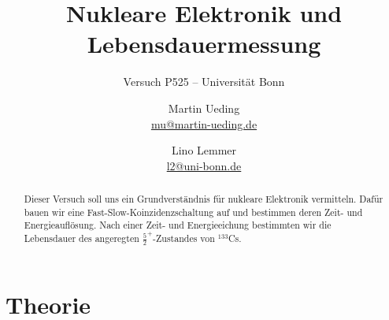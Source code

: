 

\usepackage[section]{placeins}

\usepackage{csquotes}

\usepackage{tikz}
\usetikzlibrary{chains}
\usetikzlibrary{shapes.geometric}


\usepackage{pgfplots}

\tikzexternalize

\usepackage{booktabs}

\hypersetup{
    pdftitle=
}

\subject{Praktikumsprotokoll}
\title{Nukleare Elektronik und Lebensdauermessung}
\subtitle{Versuch P525 -- Universität Bonn}
\author{
    Martin Ueding \\ \small{\href{mailto:mu@martin-ueding.de}{mu@martin-ueding.de}}
    \and
    Lino Lemmer \\
    \small{\href{mailto:l2@uni-bonn.de}{l2@uni-bonn.de}}
}

\date{}
\publishers{Tutor: Damian-Maria Piontek}



\maketitle

\begin{abstract}
    Dieser Versuch soll uns ein Grundverständnis für nukleare Elektronik
    vermitteln. Dafür bauen wir eine Fast-Slow-Koinzidenzschaltung auf und
    bestimmen deren Zeit- und Energieauflösung. Nach einer Zeit- und
    Energieeichung bestimmten wir die Lebensdauer des angeregten
    $\frac52^+$-Zustandes von ${}^{133}$Cs.
\end{abstract}

\tableofcontents

\chapter{Theorie}

